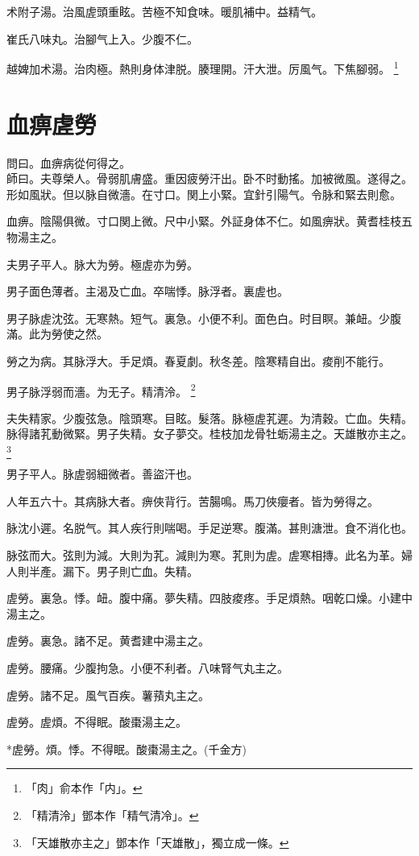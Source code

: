 \documentclass[12pt,twoside,UTF8,b5paper]{ctexbook}
\begin{document}
术附子湯。治風虗頭重眩。苦極不知食味。暖肌補中。益精气。

崔氏八味丸。治腳气上入。少腹不仁。

越婢加术湯。治肉極。熱則身体津脱。腠理開。汗大泄。厉風气。下焦腳弱。
	\footnote{「肉」俞本作「内」。}

\chapter{血痹虗勞}

問曰。血痹病從何得之。\\
師曰。夫尊榮人。骨弱肌膚盛。重因疲勞汗出。卧不时動搖。加被微風。遂得之。{形如風狀。}但以脉自微濇。在寸口。関上小緊。宜針引陽气。令脉和緊去則愈。

血痹。陰陽俱微。寸口関上微。尺中小緊。外証身体不仁。如風痹狀。黄耆桂枝五物湯主之。

夫男子平人。脉大为勞。極虗亦为勞。

男子面色薄者。主渴及亡血。卒喘悸。脉浮者。裏虗也。

男子脉虗沈弦。无寒熱。短气。裏急。小便不利。面色白。时目瞑。兼衄。少腹滿。此为勞使之然。

勞之为病。其脉浮大。手足煩。春夏劇。秋冬差。陰寒精自出。痠削不能行。

男子脉浮弱而濇。为无子。精清泠。
	\footnote{「精清泠」鄧本作「精气清冷」。}

夫失精家。少腹弦急。陰頭寒。目眩。髮落。脉極虗芤遲。为清穀。亡血。失精。脉得諸芤動微緊。男子失精。女子夢交。桂枝加龙骨牡蛎湯主之。天雄散亦主之。
	\footnote{「天雄散亦主之」鄧本作「天雄散」，獨立成一條。}

男子平人。脉虗弱細微者。善盜汗也。

人年五六十。其病脉大者。痹俠背行。苦腸鳴。馬刀俠癭者。皆为勞得之。

脉沈小遲。名脱气。其人疾行則喘喝。手足逆寒。腹滿。甚則溏泄。食不消化也。

脉弦而大。弦則为減。大則为芤。減則为寒。芤則为虗。虗寒相摶。此名为革。婦人則半產。漏下。男子則亡血。失精。

虗勞。裏急。悸。衄。腹中痛。夢失精。四肢痠疼。手足煩熱。咽乾口燥。小建中湯主之。

虗勞。裏急。諸不足。黄耆建中湯主之。

虗勞。腰痛。少腹拘急。小便不利者。八味腎气丸主之。

虗勞。諸不足。風气百疾。薯蕷丸主之。

虗勞。虗煩。不得眠。酸棗湯主之。

*虗勞。煩。悸。不得眠。酸棗湯主之。(千金方)
\end{document}
